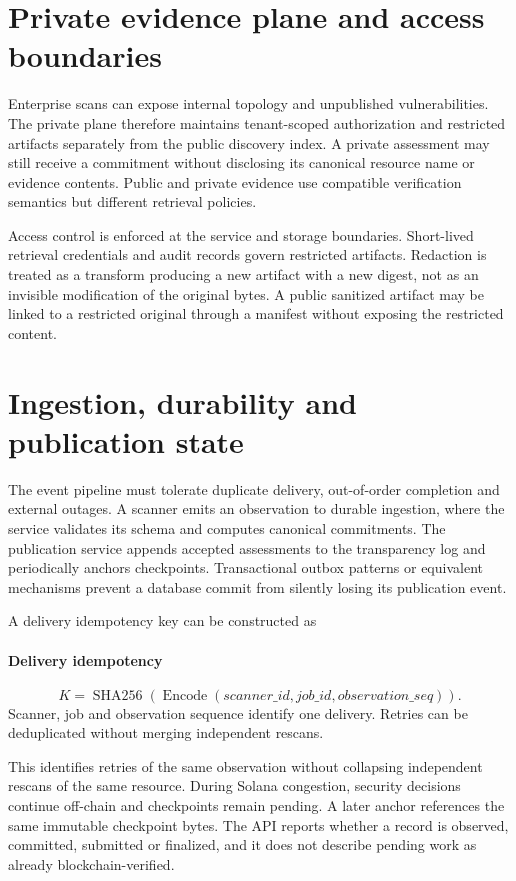 \documentclass[10pt,a4paper]{article}
\begin{document}
\section*{Private evidence plane and access boundaries}
Enterprise scans can expose internal topology and unpublished vulnerabilities. The private plane therefore maintains tenant-scoped authorization and restricted artifacts separately from the public discovery index. A private assessment may still receive a commitment without disclosing its canonical resource name or evidence contents. Public and private evidence use compatible verification semantics but different retrieval policies.


Access control is enforced at the service and storage boundaries. Short-lived retrieval credentials and audit records govern restricted artifacts. Redaction is treated as a transform producing a new artifact with a new digest, not as an invisible modification of the original bytes. A public sanitized artifact may be linked to a restricted original through a manifest without exposing the restricted content.


\section*{Ingestion, durability and publication state}
The event pipeline must tolerate duplicate delivery, out-of-order completion and external outages. A scanner emits an observation to durable ingestion, where the service validates its schema and computes canonical commitments. The publication service appends accepted assessments to the transparency log and periodically anchors checkpoints. Transactional outbox patterns or equivalent mechanisms prevent a database commit from silently losing its publication event.


A delivery idempotency key can be constructed as


\paragraph{Delivery idempotency}
\[K=\operatorname{SHA256}(\operatorname{Encode}(scanner\_id,job\_id,observation\_seq)).\]
Scanner, job and observation sequence identify one delivery. Retries can be deduplicated without merging independent rescans.


This identifies retries of the same observation without collapsing independent rescans of the same resource. During Solana congestion, security decisions continue off-chain and checkpoints remain pending. A later anchor references the same immutable checkpoint bytes. The API reports whether a record is observed, committed, submitted or finalized, and it does not describe pending work as already blockchain-verified.
\end{document}
